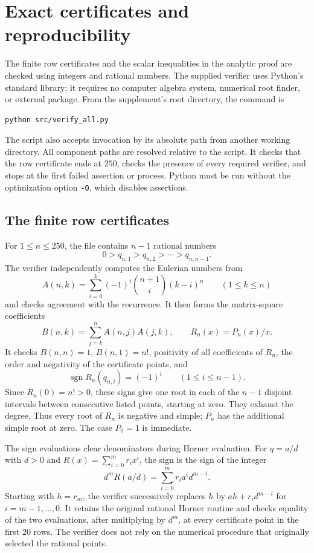 \section{Exact certificates and reproducibility}\label{sec:verification}

The finite row certificates and the scalar inequalities in the analytic
proof are checked using integers and rational numbers. The supplied
verifier uses Python's standard library; it requires no computer algebra
system, numerical root finder, or external package. From the supplement's
root directory, the command is
\begin{verbatim}
python src/verify_all.py
\end{verbatim}
The script also accepts invocation by its absolute path from another
working directory. All component paths are resolved relative to the
script. It checks that the row certificate ends at $250$, checks the
presence of every required verifier, and stops at the first failed
assertion or process. Python must be run without the optimization option
\texttt{-O}, which disables assertions.

\subsection{The finite row certificates}

For $1\le n\le250$, the file
 contains $n-1$ rational
numbers
\[
 0>q_{n,1}>q_{n,2}>\cdots>q_{n,n-1}.
\]
The verifier independently computes the Eulerian numbers from
\[
 A(n,k)=\sum_{i=0}^k(-1)^i\binom{n+1}{i}(k-i)^n
       \qquad(1\le k\le n)
\]
and checks agreement with the recurrence. It then forms the matrix-square
coefficients
\[
 B(n,k)=\sum_{j=k}^n A(n,j)A(j,k),\qquad
 R_n(x)=P_n(x)/x.
\]
It checks $B(n,n)=1$, $B(n,1)=n!$, positivity of all coefficients of
$R_n$, the order and negativity of the certificate points, and
\[
 \operatorname{sgn}R_n(q_{n,i})=(-1)^i
       \qquad(1\le i\le n-1).
\]
Since $R_n(0)=n!>0$, these signs give one root in each of the $n-1$
disjoint intervals between consecutive listed points, starting at zero.
They exhaust the degree. Thus every root of $R_n$ is negative and simple;
$P_n$ has the additional simple root at zero. The case $P_0=1$ is immediate.

The sign evaluations clear denominators during Horner evaluation.
For $q=a/d$ with $d>0$ and
$R(x)=\sum_{i=0}^m r_i x^i$, the sign is the sign of the integer
\[
 d^mR(a/d)=\sum_{i=0}^m r_i a^i d^{m-i}.
\]
Starting with $h=r_m$, the verifier successively replaces
$h$ by $ah+r_i d^{m-i}$ for $i=m-1,\ldots,0$.
It retains the original rational Horner routine and checks equality of
the two evaluations, after multiplying by $d^m$, at every certificate
point in the first $20$ rows.
The verifier does not rely on the numerical procedure that originally
selected the rational points.

